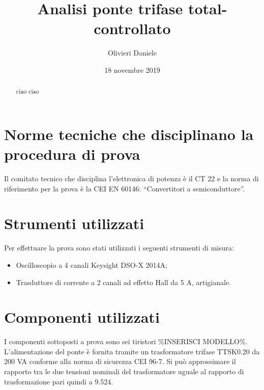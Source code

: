 \documentclass[a4paper,10pt]{article}
\title{Analisi ponte trifase total-controllato}
\author{Olivieri Daniele}
\date{18 novembre 2019}
\begin{document}
\maketitle

\begin{abstract}
 ciao ciao
\end{abstract}

\section{Norme tecniche che disciplinano la procedura di prova}
Il comitato tecnico che disciplina l'elettronica di potenza è il CT 22 e la norma
di riferimento per la prova è la CEI EN 60146: ``Convertitori a semiconduttore''.

\section{Strumenti utilizzati}
Per effettuare la prova sono stati utilizzati i seguenti strumenti di misura:
\begin{itemize}
 \item Oscilloscopio a 4 canali Keysight DSO-X 2014A;
 \item Trasduttore di corrente a 2 canali ad effetto Hall da 5 A, artigianale.
\end{itemize}

\section{Componenti utilizzati}
I componenti sottoposti a prova sono sei tiristori \%INSERISCI MODELLO\%.
L'alimentazione del ponte è fornita tramite un trasformatore trifase TTSK0.20 da 
200 VA conforme alla norma di sicurezza CEI 96-7.
Si può approssimare il rapporto tra le due tensioni nominali del trasformatore uguale al 
rapporto di trasformazione pari quindi a 9.524.
\end{document}
